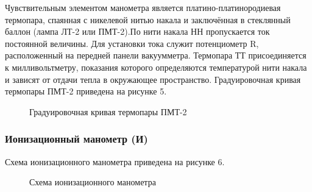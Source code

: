 Чувствительным элементом манометра является платино-платинородиевая термопара, спаянная с никелевой нитью накала и заключённая в стеклянный баллон (лампа ЛТ-2 или ПМТ-2).По нити накала НН пропускается ток постоянной величины. Для установки тока служит потенциометр R, расположенный на передней панели вакуумметра. Термопара ТТ присоединяется к милливольтметру, показания которого определяются температурой нити накала и зависят от отдачи тепла в окружающее пространство. Градуировочная кривая термопары ПМТ-2 приведена на рисунке 5.
\begin{figure}[ht]
    \label{figure5}
    \caption{Градуировочная кривая термопары ПМТ-2}
\end{figure}

\subsubsection{Ионизационный манометр (И)}
Схема ионизационного манометра приведена на рисунке 6.
\begin{figure}[ht]
    \label{figure6}
    \caption{Схема ионизационного манометра}
\end{figure}

